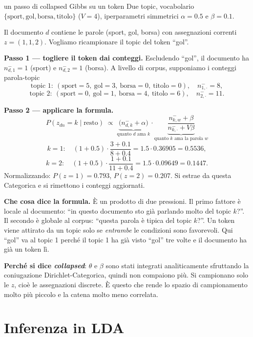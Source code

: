 \begin{esempiosvolto}{un passo di collapsed Gibbs su un token}
Due topic, vocabolario $\{\text{sport}, \text{gol}, \text{borsa}, \text{titolo}\}$ ($V = 4$), iperparametri simmetrici $\alpha = 0.5$ e $\beta = 0.1$.

Il documento $d$ contiene le parole (sport, gol, borsa) con assegnazioni correnti $z = (1, 1, 2)$. Vogliamo ricampionare il topic del token ``gol''.

\medskip
\textbf{Passo 1 — togliere il token dai conteggi.} Escludendo ``gol'', il documento ha $n_{d,1}^{-} = 1$ (sport) e $n_{d,2}^{-} = 1$ (borsa). A livello di corpus, supponiamo i conteggi parola-topic
\[
\text{topic }1: \ (\text{sport}{=}5,\ \text{gol}{=}3,\ \text{borsa}{=}0,\ \text{titolo}{=}0), \quad n_{1,\cdot}^{-} = 8,
\]
\[
\text{topic }2: \ (\text{sport}{=}0,\ \text{gol}{=}1,\ \text{borsa}{=}4,\ \text{titolo}{=}6), \quad n_{2,\cdot}^{-} = 11.
\]

\medskip
\textbf{Passo 2 — applicare la formula.}
\[
P(z_{dn} = k \mid \text{resto}) \;\propto\; \underbrace{\big(n_{d,k}^{-} + \alpha\big)}_{\text{quanto } d \text{ ama } k} \cdot \underbrace{\frac{n_{k,w}^{-} + \beta}{n_{k,\cdot}^{-} + V\beta}}_{\text{quanto } k \text{ ama la parola } w}
\]
\[
k = 1:\quad (1 + 0.5) \cdot \frac{3 + 0.1}{8 + 0.4} = 1.5 \cdot 0.36905 = 0.5536,
\]
\[
k = 2:\quad (1 + 0.5) \cdot \frac{1 + 0.1}{11 + 0.4} = 1.5 \cdot 0.09649 = 0.1447.
\]
Normalizzando: $P(z = 1) = 0.793$, $P(z = 2) = 0.207$. Si estrae da questa Categorica e si rimettono i conteggi aggiornati.

\medskip
\textbf{Che cosa dice la formula.} È un prodotto di due pressioni. Il primo fattore è locale al documento: ``in questo documento sto già parlando molto del topic $k$?''. Il secondo è globale al corpus: ``questa parola è tipica del topic $k$?''. Un token viene attirato da un topic solo se \emph{entrambe} le condizioni sono favorevoli. Qui ``gol'' va al topic 1 perché il topic 1 ha già visto ``gol'' tre volte e il documento ha già un token lì.

\textbf{Perché si dice \emph{collapsed}}: $\theta$ e $\beta$ sono stati integrati analiticamente sfruttando la coniugazione Dirichlet-Categorica, quindi non compaiono più. Si campionano solo le $z$, cioè le assegnazioni discrete. È questo che rende lo spazio di campionamento molto più piccolo e la catena molto meno correlata.
\end{esempiosvolto}

\section{Inferenza in LDA}

